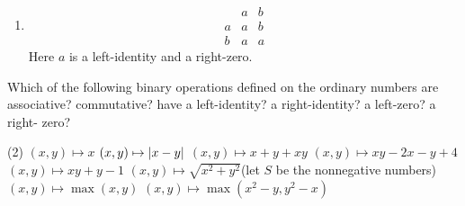 \begin{solution}
\begin{enumerate}[label=(\alph*)]
    \item
    \[\begin{array}{c|cc}
          & a & b\\
        \hline
        a & a & b\\
        b & a & a
    \end{array}\]
    Here $a$ is a left-identity and a right-zero.
\end{enumerate}
\end{solution}

\begin{exercise}
Which of the following binary operations defined on the ordinary numbers are
associative? commutative? have a left-identity? a right-identity? a left-zero? a right-
zero?
\begin{tasks}[label=(\alph*),label-width=1.4em](2)
    \task $(x,y)\mapsto x$
    \task $(x,y)\mapsto \left\lvert x-y\right\rvert$
    \task $(x,y)\mapsto x+y+xy$
    \task $(x,y)\mapsto xy-2x-y+4$
    \task $(x,y)\mapsto xy+y-1$
    \task $(x,y)\mapsto \sqrt{x^2+y^2}$\quad (let $S$ be the nonnegative numbers)
    \task $(x,y)\mapsto \max(x,y)$
    \task $(x,y)\mapsto \max(x^2-y,y^2-x)$
\end{tasks}
\end{exercise}

